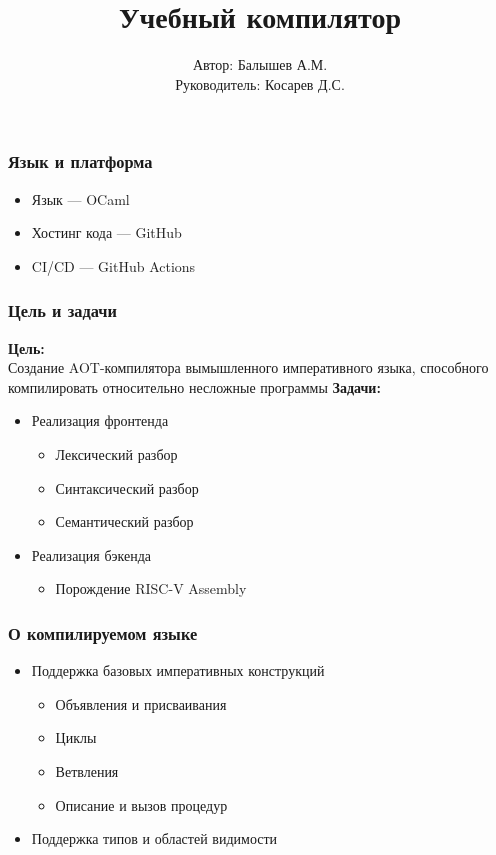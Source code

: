 \documentclass{beamer}
\title{Учебный компилятор}
\author[Балышев А.М.]{Автор: Балышев А.М. \\ Руководитель: Косарев Д.С.}
\begin{document}
	\begin{frame}[plain]
		\maketitle
	\end{frame}
	
	\begin{frame}
	\frametitle{Язык и платформа}
	\begin{itemize}
			\item Язык — OCaml
			\item Хостинг кода — GitHub
			\item CI/CD — GitHub Actions
		\end{itemize}
	\end{frame}
	
	\begin{frame}
		\frametitle{Цель и задачи}
		\textbf{Цель:} \\
		Создание AOT-компилятора вымышленного императивного языка, способного компилировать относительно несложные программы
		\textbf{Задачи:}\\
		\begin{itemize}
			\item Реализация фронтенда
			\begin{itemize}
				\item Лексический разбор
				\item Синтаксический разбор
				\item Семантический разбор
			\end{itemize}
			\item Реализация бэкенда
			\begin{itemize}
				\item Порождение RISC-V Assembly
			\end{itemize}
		\end{itemize}
	\end{frame}
	
	\begin{frame}
		\frametitle{О компилируемом языке}
		\begin{itemize}
			\item Поддержка базовых императивных конструкций
			\begin{itemize}
				\item Объявления и присваивания
				\item Циклы
				\item Ветвления
				\item Описание и вызов процедур
			\end{itemize}
			\item Поддержка типов и областей видимости
		\end{itemize}
	\end{frame}
	
\end{document}
